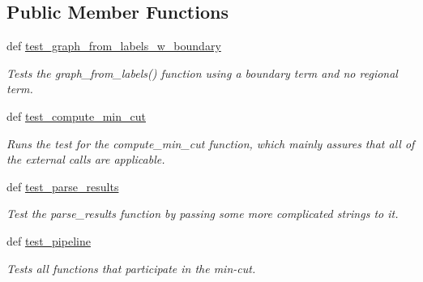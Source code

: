 \subsection*{Public Member Functions}
\begin{DoxyCompactItemize}
\item 
\hypertarget{classmedpy_1_1unittests_1_1graphcut_1_1graph_1_1TestGraph_a19d5a3f0c6ccd4586e5467f2c5872c96}{
def \hyperlink{classmedpy_1_1unittests_1_1graphcut_1_1graph_1_1TestGraph_a19d5a3f0c6ccd4586e5467f2c5872c96}{test\_\-graph\_\-from\_\-labels\_\-w\_\-boundary}}
\label{classmedpy_1_1unittests_1_1graphcut_1_1graph_1_1TestGraph_a19d5a3f0c6ccd4586e5467f2c5872c96}

\begin{DoxyCompactList}\small\item\em Tests the  graph\_\-from\_\-labels() function using a boundary term and no regional term. \end{DoxyCompactList}\item 
\hypertarget{classmedpy_1_1unittests_1_1graphcut_1_1graph_1_1TestGraph_a557503006c6cd9b46e8542ad2f550bd5}{
def \hyperlink{classmedpy_1_1unittests_1_1graphcut_1_1graph_1_1TestGraph_a557503006c6cd9b46e8542ad2f550bd5}{test\_\-compute\_\-min\_\-cut}}
\label{classmedpy_1_1unittests_1_1graphcut_1_1graph_1_1TestGraph_a557503006c6cd9b46e8542ad2f550bd5}

\begin{DoxyCompactList}\small\item\em Runs the test for the  compute\_\-min\_\-cut function, which mainly assures that all of the external calls are applicable. \end{DoxyCompactList}\item 
\hypertarget{classmedpy_1_1unittests_1_1graphcut_1_1graph_1_1TestGraph_a5b5d63bc737ad38bff8502901151f0bb}{
def \hyperlink{classmedpy_1_1unittests_1_1graphcut_1_1graph_1_1TestGraph_a5b5d63bc737ad38bff8502901151f0bb}{test\_\-parse\_\-results}}
\label{classmedpy_1_1unittests_1_1graphcut_1_1graph_1_1TestGraph_a5b5d63bc737ad38bff8502901151f0bb}

\begin{DoxyCompactList}\small\item\em Test the  parse\_\-results function by passing some more complicated strings to it. \end{DoxyCompactList}\item 
\hypertarget{classmedpy_1_1unittests_1_1graphcut_1_1graph_1_1TestGraph_a8a2232a7f5e69289335bacb23bdcc0f9}{
def \hyperlink{classmedpy_1_1unittests_1_1graphcut_1_1graph_1_1TestGraph_a8a2232a7f5e69289335bacb23bdcc0f9}{test\_\-pipeline}}
\label{classmedpy_1_1unittests_1_1graphcut_1_1graph_1_1TestGraph_a8a2232a7f5e69289335bacb23bdcc0f9}

\begin{DoxyCompactList}\small\item\em Tests all functions that participate in the min-\/cut. \end{DoxyCompactList}\end{DoxyCompactItemize}



